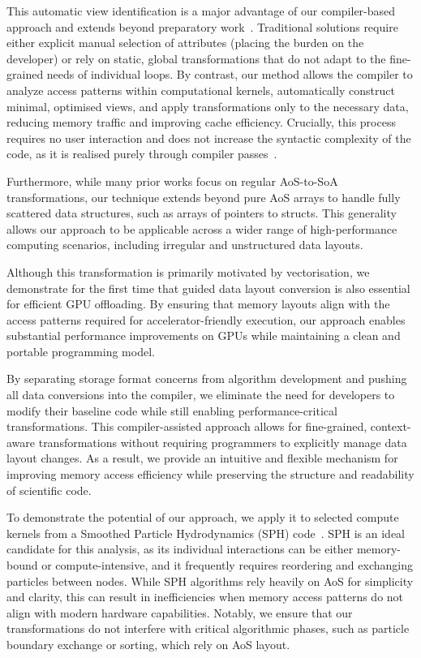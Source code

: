This automatic view identification is a major advantage of our compiler-based approach and extends beyond preparatory work~\cite{Radtke:2024:AoStoSoA}. Traditional solutions require either explicit manual selection of attributes (placing the burden on the developer) or rely on static, global transformations that do not adapt to the fine-grained needs of individual loops. By contrast, our method allows the compiler to analyze access patterns within computational kernels, automatically construct minimal, optimised views, and apply transformations only to the necessary data, reducing memory traffic and improving cache efficiency. Crucially, this process requires no user interaction and does not increase the syntactic complexity of the code, as it is realised purely through compiler passes~\cite{Xu:2014:SemiAutomaticComposition}.

Furthermore, while many prior works focus on regular AoS-to-SoA transformations, our technique extends beyond pure AoS arrays to handle fully scattered data structures, such as arrays of pointers to structs. This generality allows our approach to be applicable across a wider range of high-performance computing scenarios, including irregular and unstructured data layouts.

Although this transformation is primarily motivated by vectorisation, we demonstrate for the first time that guided data layout conversion is also essential for efficient GPU offloading. By ensuring that memory layouts align with the access patterns required for accelerator-friendly execution, our approach enables substantial performance improvements on GPUs while maintaining a clean and portable programming model.

By separating storage format concerns from algorithm development and pushing all data conversions into the compiler, we eliminate the need for developers to modify their baseline code while still enabling performance-critical transformations. This compiler-assisted approach allows for fine-grained, context-aware transformations without requiring programmers to explicitly manage data layout changes. As a result, we provide an intuitive and flexible mechanism for improving memory access efficiency while preserving the structure and readability of scientific code.

To demonstrate the potential of our approach, we apply it to selected compute kernels from a Smoothed Particle Hydrodynamics (SPH) code~\cite{Schaller:2024:Swift}. SPH is an ideal candidate for this analysis, as its individual interactions can be either memory-bound or compute-intensive, and it frequently requires reordering and exchanging particles between nodes. While SPH algorithms rely heavily on AoS for simplicity and clarity, this can result in inefficiencies when memory access patterns do not align with modern hardware capabilities. Notably, we ensure that our transformations do not interfere with critical algorithmic phases, such as particle boundary exchange or sorting, which rely on AoS layout.

